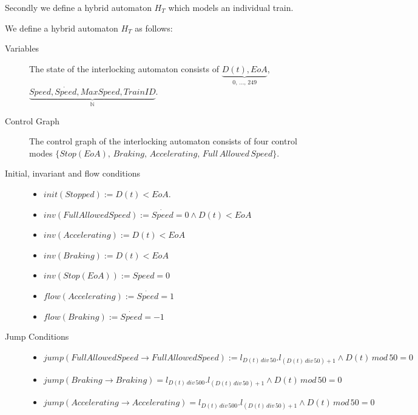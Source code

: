 Secondly we define a hybrid automaton $H_{T}$ which models an individual train. 
\medskip
\begin{mydef}

We define a hybrid automaton $H_{T}$ as follows:
\begin{description}
\item[Variables] The state of the interlocking automaton consists of $\underbrace{D(t), EoA}_\text{0, \ldots , 249}$, \newline $\underbrace{Speed, \dot{Speed}, MaxSpeed, TrainID}_{\mathbb{N}}$.

\item[Control Graph] The control graph of the interlocking automaton consists of four control modes $\{Stop (EoA), \, Braking, \, Accelerating, \, Full \, Allowed \, Speed \}$.

\item[Initial, invariant and flow conditions] \hspace*{0mm}
	\begin{itemize}
	\item $init(Stopped) :=   D(t) < EoA  $.

	\item $inv(Full Allowed Speed) :=   \dot{Speed} = 0 \wedge D(t) < EoA$ 

	\item $inv(Accelerating) := D(t) < EoA$

	\item $inv(Braking)  := D(t) < EoA$
	
	\item $inv(Stop (EoA)) := Speed = 0$ 

	\item $flow(Accelerating):= \dot{Speed} = 1$ 
	
	\item $flow(Braking) := \dot{Speed} = -1$
	
	\end{itemize}

\item[Jump Conditions] \hspace*{0mm}

	\begin{itemize}
	\item $jump(Full Allowed Speed \to Full Allowed Speed) := l_{D(t) \, div \, 50}.l_{(D(t) \, div \, 50) +1} \wedge D(t) \, mod \, 50 = 0$
\item $jump(Braking \to Braking) = l_{D(t) \, div \, 500}.l_{(D(t) \, div \, 50) +1} \wedge D(t) \, mod \, 50 = 0$
\item $jump(Accelerating \to Accelerating) = l_{D(t) \, div \, 500}.l_{(D(t) \, div \, 50) +1} \wedge D(t) \, mod \, 50 = 0$


\end{itemize}
\end{description}
\end{mydef}
